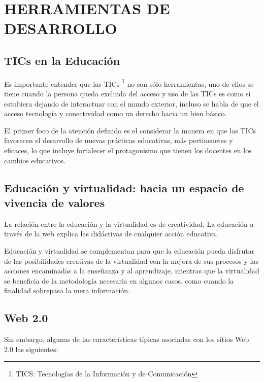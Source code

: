 \chapter{HERRAMIENTAS DE DESARROLLO}

\section{TICs en la Educaci\'{o}n}

Es importante entender que las TICs \footnote{TICS: Tecnolog\'{i}as de la 
Informaci\'{o}n y de Comunicaci\'{o}n} no son s\'{o}lo herramientas, uno de ellos
se tiene cuando la persona queda excluida del acceso y uso de las TICs es como si
estubiera dejando de interactuar con el mundo exterior, incluso se habla de que 
el acceso tecnolog\'{i}a y conectividad como un derecho hacia un bien b\'{a}sico.

El primer foco de la atenci\'{o}n definido es el considerar la manera en que las TICs
favorecen el desarrollo de nuevas pr\'{a}cticas educativas, m\'{a}s pertinenetes y eficaces,
lo que incluye fortalecer el protagonismo que tienen los docentes en los cambios
educativos.\cite{severin2013enfoques}

\section{Educaci\'{o}n y virtualidad: hacia un espacio de vivencia de valores}

La relaci\'{o}n entre la educaci\'{o}n y la virtualidad es de creatividad. La 
educaci\'{o}n a trav\'{e}s de la web explica las did\'{a}ctivas de cualquier 
acci\'{o}n educativa. 

Educaci\'{o}n y virtualidad se complementan para que la educaci\'{o}n pueda 
disfrutar de las posibilidades creativas de la virtualidad con la mejora de sus
procesos y las acciones encaminadas a la ense\~{n}anza y al aprendizaje, mientras
que la virtualidad se beneficia de la metodolog\'{i}a necesaria en algunos casos,
como cuando la finalidad sobrepasa la mera informaci\'{o}n.
\cite{duart2000aprender}

\section{Web 2.0}

Sin embargo, algunas de las caracter\'{i}sticas t\'{i}picas asociadas con los sitios
Web 2.0 las siguientes:

